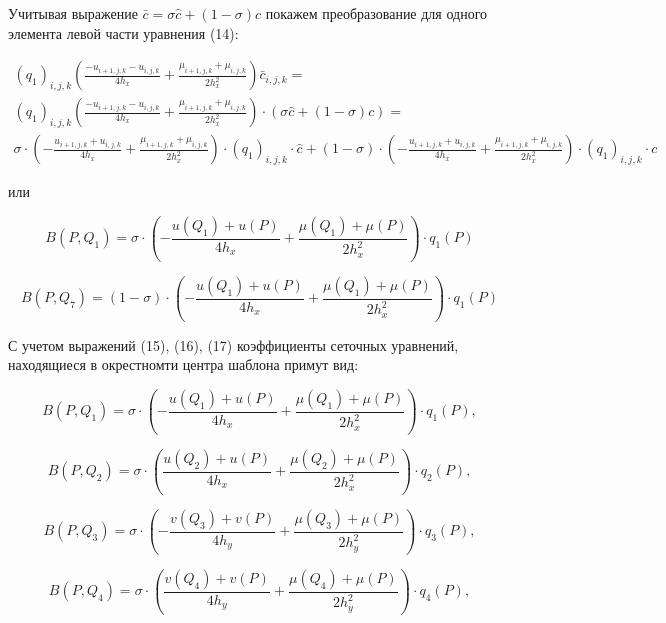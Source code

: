 \documentclass[12pt]{article}
\begin{document}
Учитывая выражение $\bar{c}=\sigma\hat{c}+(1-\sigma)c $ покажем преобразование для одного элемента левой части уравнения (14):

\begin{multline}
	(q_1)_{i,j,k} \left( \frac{-u_{i+1,j,k}- u_{i,j,k}  }{4h_x}  +	
\frac{\mu_{i+1,j,k}+ \mu_{i,j,k}}{2h_x^2} \right) \bar{c}_{i,j,k} = \\
(q_1)_{i,j,k} \left( \frac{-u_{i+1,j,k}- u_{i,j,k}  }{4h_x}  +	
\frac{\mu_{i+1,j,k}+ \mu_{i,j,k}}{2h_x^2} \right) \cdot (\sigma\hat{c}+(1-\sigma)c) = \\ 
\sigma\cdot \left( -\frac{u_{i+1,j,k} + u_{i,j,k}  }{4h_x}  +	
\frac{\mu_{i+1,j,k}+ \mu_{i,j,k}}{2h_x^2} \right) \cdot (q_1)_{i,j,k} \cdot \hat{c} +
(1-\sigma)\cdot \left( -\frac{u_{i+1,j,k} + u_{i,j,k}  }{4h_x}  +	
\frac{\mu_{i+1,j,k}+ \mu_{i,j,k}}{2h_x^2} \right) \cdot (q_1)_{i,j,k} \cdot c
\end{multline}

или

\begin{equation}
	B(P, Q_1) = \sigma \cdot \left( -\frac{u(Q_1) + u(P) }{4h_x}  +	
	\frac{\mu(Q_1)+ \mu(P)}{2h_x^2} \right) \cdot q_1(P) 
\end{equation}	

\begin{equation}
	B(P, Q_7) = (1-\sigma) \cdot \left( -\frac{u(Q_1) + u(P) }{4h_x}  +	
	\frac{\mu(Q_1)+ \mu(P)}{2h_x^2} \right) \cdot q_1(P) 
\end{equation}

С учетом выражений (15), (16), (17) коэффициенты сеточных уравнений, находящиеся в окрестномти центра шаблона примут  вид:

\begin{equation*}
	B(P, Q_1) = \sigma \cdot \left( -\frac{u(Q_1) + u(P) }{4h_x}  +	
	\frac{\mu(Q_1)+ \mu(P)}{2h_x^2} \right) \cdot q_1(P), 
\end{equation*}

\begin{equation*}
	B(P, Q_2) = \sigma \cdot \left( \frac{u(Q_2) + u(P) }{4h_x}  +	
	\frac{\mu(Q_2)+ \mu(P)}{2h_x^2} \right) \cdot q_2(P), 
\end{equation*}

\begin{equation*}
	B(P, Q_3) = \sigma \cdot \left( -\frac{v(Q_3) + v(P) }{4h_y}  +	
	\frac{\mu(Q_3)+ \mu(P)}{2h_y^2} \right) \cdot q_3(P), 
\end{equation*}

\begin{equation*}
	B(P, Q_4) = \sigma \cdot \left( \frac{v(Q_4) + v(P) }{4h_y}  +	
	\frac{\mu(Q_4)+ \mu(P)}{2h_y^2} \right) \cdot q_4(P), 
\end{equation*}
\end{document}
